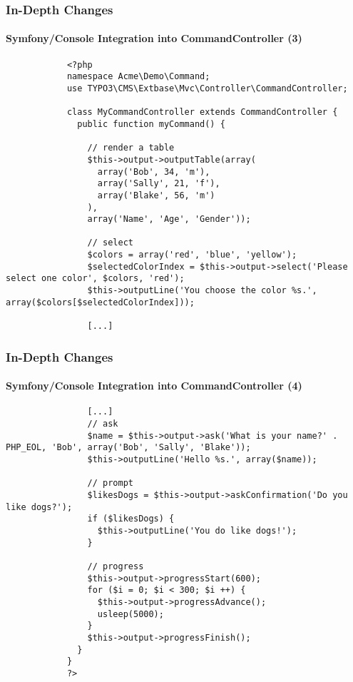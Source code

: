 \begin{frame}[fragile]
	\frametitle{In-Depth Changes}
	\framesubtitle{Symfony/Console Integration into CommandController (3)}

	\lstset{basicstyle=\tiny\ttfamily}

		\begin{lstlisting}
			<?php
			namespace Acme\Demo\Command;
			use TYPO3\CMS\Extbase\Mvc\Controller\CommandController;

			class MyCommandController extends CommandController {
			  public function myCommand() {

			    // render a table
			    $this->output->outputTable(array(
			      array('Bob', 34, 'm'),
			      array('Sally', 21, 'f'),
			      array('Blake', 56, 'm')
			    ),
			    array('Name', 'Age', 'Gender'));

			    // select
			    $colors = array('red', 'blue', 'yellow');
			    $selectedColorIndex = $this->output->select('Please select one color', $colors, 'red');
			    $this->outputLine('You choose the color %s.', array($colors[$selectedColorIndex]));

			    [...]
		\end{lstlisting}

\end{frame}


\begin{frame}[fragile]
	\frametitle{In-Depth Changes}
	\framesubtitle{Symfony/Console Integration into CommandController (4)}

	\lstset{basicstyle=\tiny\ttfamily}

		\begin{lstlisting}
			    [...]
			    // ask
			    $name = $this->output->ask('What is your name?' . PHP_EOL, 'Bob', array('Bob', 'Sally', 'Blake'));
			    $this->outputLine('Hello %s.', array($name));

			    // prompt
			    $likesDogs = $this->output->askConfirmation('Do you like dogs?');
			    if ($likesDogs) {
			      $this->outputLine('You do like dogs!');
			    }

			    // progress
			    $this->output->progressStart(600);
			    for ($i = 0; $i < 300; $i ++) {
			      $this->output->progressAdvance();
			      usleep(5000);
			    }
			    $this->output->progressFinish();
			  }
			}
			?>
		\end{lstlisting}

\end{frame}


